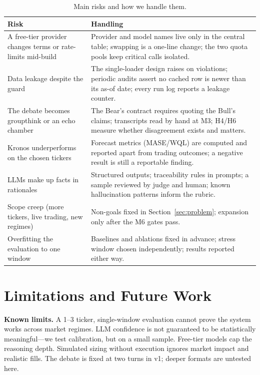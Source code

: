\documentclass[conference]{IEEEtran}
\begin{document}
\begin{table}[!t]
\centering
\caption{Main risks and how we handle them.}
\label{tab:risks}
\small
\begin{tabularx}{\columnwidth}{X L{3.6cm}}
\toprule
\textbf{Risk} & \textbf{Handling} \\
\midrule
A free-tier provider changes terms or rate-limits mid-build & Provider and model names live only in the central table; swapping is a one-line change; the two quota pools keep critical calls isolated. \\
\addlinespace[2pt]
Data leakage despite the guard & The single-loader design raises on violations; periodic audits assert no cached row is newer than its as-of date; every run log reports a leakage counter. \\
\addlinespace[2pt]
The debate becomes groupthink or an echo chamber & The Bear's contract requires quoting the Bull's claims; transcripts read by hand at M3; H4/H6 measure whether disagreement exists and matters. \\
\addlinespace[2pt]
Kronos underperforms on the chosen tickers & Forecast metrics (MASE/WQL) are computed and reported apart from trading outcomes; a negative result is still a reportable finding. \\
\addlinespace[2pt]
LLMs make up facts in rationales & Structured outputs; traceability rules in prompts; a sample reviewed by judge and human; known hallucination patterns \cite{ji2023hallucination} inform the rubric. \\
\addlinespace[2pt]
Scope creep (more tickers, live trading, new regimes) & Non-goals fixed in Section~\ref{sec:problem}; expansion only after the M6 gates pass. \\
\addlinespace[2pt]
Overfitting the evaluation to one window & Baselines and ablations fixed in advance; stress window chosen independently; results reported either way. \\
\bottomrule
\end{tabularx}
\end{table}

\section{Limitations and Future Work}

\textbf{Known limits.} A 1--3 ticker, single-window evaluation cannot prove the system works across market regimes. LLM confidence is not guaranteed to be statistically meaningful---we test calibration, but on a small sample. Free-tier models cap the reasoning depth. Simulated sizing without execution ignores market impact and realistic fills. The debate is fixed at two turns in v1; deeper formats \cite{smit2024mad} are untested here.
\end{document}
